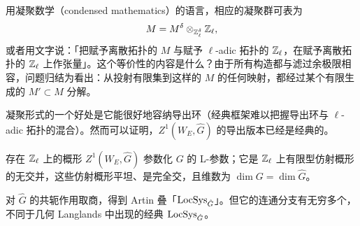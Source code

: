 \begin{remark}
用凝聚数学（condensed mathematics）的语言，相应的凝聚群可表为
\[
M=M^\delta\otimes_{\mathbb{Z}_\ell^\delta}\mathbb{Z}_\ell,
\]
或者用文字说：「把赋予离散拓扑的 $M$ 与赋予 $\ell$-adic 拓扑的 $\mathbb{Z}_\ell$，在赋予离散拓扑的 $\mathbb{Z}_\ell$ 上作张量」。这个等价性的内容是什么？由于所有构造都与滤过余极限相容，问题归结为看出：从投射有限集到这样的 $M$ 的任何映射，都经过某个有限生成的 $M'\subset M$ 分解。
\end{remark}

\begin{remark}
凝聚形式的一个好处是它能很好地容纳导出环（经典框架难以把握导出环与 $\ell$-adic 拓扑的混合）。然而可以证明，$Z^1(W_E,\hat G)$ 的导出版本已经是经典的。
\end{remark}

\begin{theorem}
存在 $\mathbb{Z}_\ell$ 上的概形 $Z^1(W_E,\hat G)$ 参数化 $G$ 的 L-参数；它是 $\mathbb{Z}_\ell$ 上有限型仿射概形的无交并，这些仿射概形平坦、是完全交，且维数为 $\dim G=\dim\hat G$。
\end{theorem}

\begin{remark}
对 $\hat G$ 的共轭作用取商，得到 Artin 叠「$\mathrm{LocSys}_{\hat G}$」。但它的连通分支有无穷多个，不同于几何 Langlands 中出现的经典 $\mathrm{LocSys}_{\hat G}$。
\end{remark}

